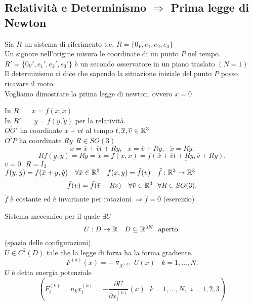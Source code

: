 \documentclass{article}
\begin{document}
	\subsection{Relatività e Determinismo $ \Rightarrow $ Prima legge di Newton}
	Sia $R$ un sistema di riferimento t.c.  $R = \{0_V, e_1,e_2,e_3\}$\\
	Un signore nell'origine misura le coordinate di un punto $P$ nel tempo.\\
	$R'=\{0_V', e_1',e_2',e_3'\}$ è un secondo osservatore in un piano traslato $(N=1)$\\
	Il determinismo ci dice che sapendo la situazione iniziale del punto  $P$ posso ricavare il moto.\\
	Vogliamo dimostrare la prima legge di newton, ovvero $\ddot x = 0$
	\begin{dimo}
 In $R$ \ \ \ $\ddot x = f(x,\dot x)$	\\
 In $R'$ \ \ \  $\ddot y = f(y,\dot y)$ per la relatività.\\
 $ \overline{OO'}$ ha coordinate $ \overline{x} + \overline{v}t$ al tempo $t, \overline{x}, \overline{v}\in\mathbb{R}^3$\\
 $ \overline{O'P}$ ha coordinate $Ry \ \ R\in SO(3)$\\
  \[
 x = \overline{x} + \overline{v}t + Ry, \ \ \ \dot x = \overline{v} + R\dot y, \ \ \ \ddot x = R\ddot y
 .\] 
 \[
	 \underline{Rf(y,\dot y)} = R\ddot y = \ddot x = f(x,\dot x) =\underline{ f( \overline{x} + \overline{v}t + Ry, \overline{v} + R\dot y)}
 .\] 
 $\overline v = 0 \ \ \ R = I_3$\\
  $f(y,\dot y ) = f(\bar x + y, \dot y) \ \ \ \forall \bar x \in \R^3 \ \ \ f(x,y) = \tilde f(v) \ \ \ \tilde f:\R^3 \rightarrow\R^3$\\
  \[
  \tilde f(v) = \tilde f ( \bar v + R v) \ \ \ \forall\bar v \in \R^3 \ \ \forall R\in SO(3)
  .\] 
  $\tilde f$ è costante ed è invariante per rotazioni $ \Rightarrow \tilde f = 0$ (esercizio) 
\end{dimo}
\begin{defi}
	Sistema meccanico per il quale $\exists U$\\
	 \[
		 U: D \rightarrow\mathbb{R} \ \ \ D\subseteq \mathbb{R}^{3N} \ \ \text{aperto}
	.\] 
	(spazio delle configurazioni)\\
	$U\in C^2(D)$ tale che la legge di forza ha la forma gradiente.\\
	 \[
		 F^{(k)}(x) = -\triangledown_{X^{(k)}}U(x) \ \ \ \ k = 1,\ldots, N
	.\] 
	$U$ è detta energia potenziale
	\[(F^{(k)}_i = n_k \ddot x^{(k)}_i = -\frac{\partial U}{\partial x_i^{(k)}}(x) \  \ \ k=1,\ldots,N, \ \ i=1,2,3) \]
\end{defi}
\end{document}

